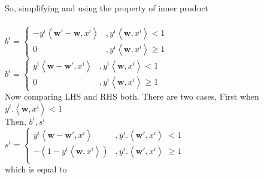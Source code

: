 \documentclass[a4paper,11pt]{article}
\begin{document}
\begin{mlsolution}
So, simplifying and using the property of inner product\\\\

\begin{math}
b^{i} = \left\{\begin{matrix}
-y^{i} \left \langle \textbf{w}{}' - \textbf{w}, x^{i}\right \rangle & ,y^{i}\left \langle \textbf{w}, x^{i} \right \rangle < 1\\ 
0 & ,y^{i}\left \langle \textbf{w}, x^{i} \right \rangle \geq 1
\end{matrix}\right.
\end{math}\\

\begin{math}
b^{i} = \left\{\begin{matrix}
y^{i} \left \langle \textbf{w} - \textbf{w}{}', x^{i} \right \rangle & ,y^{i}\left \langle \textbf{w}, x^{i} \right \rangle < 1\\ 
0 & ,y^{i}\left \langle \textbf{w}, x^{i} \right \rangle \geq 1
\end{matrix}\right.
\end{math}\\

Now comparing LHS and RHS both. There are two cases, First when \begin{math}y^{i}.\left \langle \textbf{w}, x^{i} \right \rangle < 1 \end{math}\\

Then, \begin{math}b^{i}, s^{i}\end{math}\\

\begin{math}
s^{i} = \left\{\begin{matrix}
y^{i} \left \langle \textbf{w} -\textbf{w}{}', x^{i}\right \rangle & ,y^{i}.\left \langle \textbf{w}{}', x^{i} \right \rangle \; <  1\\ 
- \left ( 1 - y^{i}\left \langle \textbf{w}, x^{i}\right \rangle \right ) & ,y^{i}.\left \langle \textbf{w}{}', x^{i}\right \rangle \; \geq  1\\ 

\end{matrix}\right.
\end{math}\\

which is equal to \\


\end{mlsolution}
\end{document}
